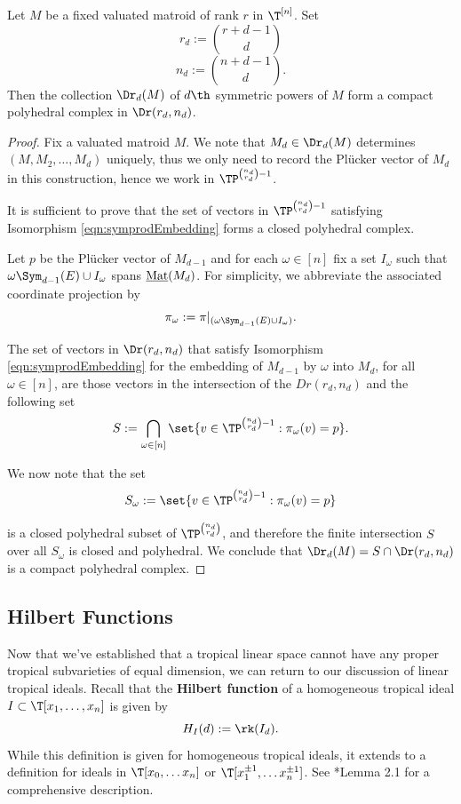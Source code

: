\begin{proposition}\label{prop:closedcompact}
Let $M$ be a fixed valuated matroid of rank $r$ in $\T^{[n]}$. Set
$$r_d:= \binom{r+d-1}{d}$$
$$n_d:= \binom{n+d-1}{d}.$$
Then the collection $\Dr_d(M)$ of $d\th$ symmetric powers of $M$ form a compact polyhedral complex in $\Dr(r_d,n_d)$.
\end{proposition}
\begin{proof}
Fix a valuated matroid $M$. We note that $M_d\in \Dr_d(M)$ determines $(M,M_2,\dots,M_d)$ uniquely, thus we only need to record the Pl\"ucker vector of $M_d$ in this construction, hence we work in $\TP^{\binom{n_d}{r_d}-1}$. 

It is sufficient to prove that the set of vectors in $\TP^{\binom{n_d}{r_d}-1}$ satisfying Isomorphism \ref{eqn:symprodEmbedding} forms a closed polyhedral complex.

Let $p$ be the Pl\"ucker vector of $M_{d-1}$ and for each $\omega\in [n]$ fix a set $I_\omega$ such that $\omega\Sym_{d-1}(E)\cup I_\omega$ spans $\operatorname{\underline{Mat}}(M_d)$. For simplicity, we abbreviate the associated coordinate projection by
$$\pi_\omega: = \pi|_{(\omega \Sym_{d-1}(E)\cup I_\omega)}.$$

The set of vectors in $\Dr(r_d,n_d)$ that satisfy Isomorphism \ref{eqn:symprodEmbedding} for the embedding of $M_{d-1}$ by $\omega$ into $M_d$, for all $\omega\in [n]$, are those vectors in the intersection of the $Dr(r_d,n_d)$ and the following set
$$S:=\bigcap_{\omega\in [n]}\set{v\in \TP^{\binom{n_d}{r_d}-1}: \pi_\omega(v) = p}.$$

We now note that the set
$$S_\omega:= \set{v\in \TP^{\binom{n_d}{r_d}-1}: \pi_{\omega}(v) = p}$$

is a closed polyhedral subset of $\TP^{\binom{n_d}{r_d}}$, and therefore the finite intersection $S$ over all $S_\omega$ is closed and polyhedral. We conclude that $\Dr_d(M)=S\cap \Dr(r_d,n_d)$ is a compact polyhedral complex. 
\end{proof}

\subsection{Hilbert Functions}\label{subsec:HF}
    Now that we've established that a tropical linear space cannot have any proper tropical subvarieties of equal dimension, we can return to our discussion of linear tropical ideals. Recall that the \textbf{Hilbert function} of a homogeneous tropical ideal $I\subset \T[x_1,\dots,x_n]$ is given by
    $$H_I(d):= \rk(I_d).$$
    While this definition is given for homogeneous tropical ideals, it extends to a definition for ideals in $\T[x_0,\dots x_n]$ or $\T[x_1^{\pm1},\dots x_n^{\pm1}]$. See \cite{MR20}*{Lemma 2.1} for a comprehensive description. 
    
